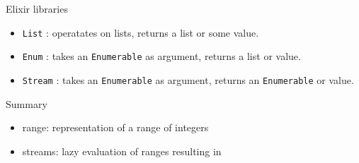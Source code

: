 \begin{frame}{Elixir libraries}

  \begin{itemize}
  \item {\tt List} : operatates on lists, returns a list or some value.  \pause
  \item {\tt Enum} : takes an {\tt Enumerable} as argument, returns a list or value. \pause
  \item {\tt Stream} : takes an {\tt Enumerable} as argument, returns an {\tt Enumerable} or value. 
  \end{itemize}

  \vspace{20pt}
  
\end{frame}

\begin{frame}{Summary}

\begin{itemize}
\pause\item {range}: representation of a range of integers
\pause\item {streams}: lazy evaluation of ranges resulting in 
\end{itemize}

\end{frame}






